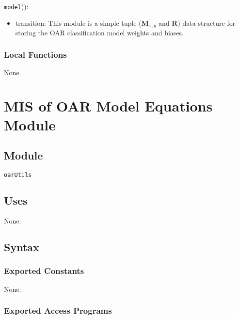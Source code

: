 \documentclass[12pt, titlepage]{article}
\def\code#1{\texttt{#1}}
\begin{document}
\noindent \code{model}():
\begin{itemize}
\item transition: This module is a simple tuple ($\mathbf{M}_{x,y}$ and $\mathbf{R}$) data structure for storing the OAR classification model weights and biases.
\end{itemize}

\subsubsection{Local Functions}

None.

\section{MIS of OAR Model Equations Module} \label{ModuleOME} 

\subsection{Module}

\code{oarUtils}

\subsection{Uses}

None.

\subsection{Syntax}

\subsubsection{Exported Constants}

None.

\subsubsection{Exported Access Programs}
\end{document}
